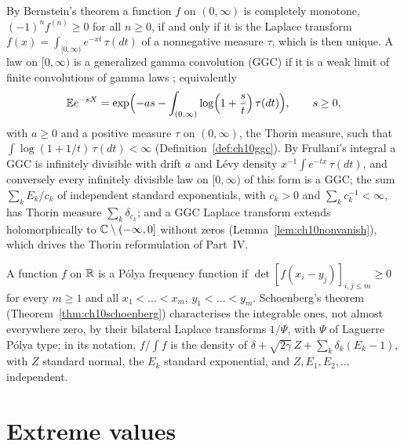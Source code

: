 By Bernstein's theorem \cite{bernstein1929,widder1941} a function $f$ on $(0,\infty)$ is completely monotone, $(-1)^nf^{(n)}\ge0$ for all $n\ge0$, if and only if it is the Laplace transform $f(x)=\int_{[0,\infty)}e^{-xt}\,\tau(dt)$ of a nonnegative measure $\tau$, which is then unique. A law on $[0,\infty)$ is a generalized gamma convolution (GGC) if it is a weak limit of finite convolutions of gamma laws \cite{thorin1977,bondesson1992}; equivalently
\[
\mathbb{E} e^{-sX}=\exp\Bigl(-as-\int_{(0,\infty)}\log\Bigl(1+\frac{s}{t}\Bigr)\,\tau(dt)\Bigr),\qquad s\ge0,
\]
with $a\ge0$ and a positive measure $\tau$ on $(0,\infty)$, the Thorin measure, such that $\int\log(1+1/t)\,\tau(dt)<\infty$ (Definition~\ref{def:ch10ggc}). By Frullani's integral a GGC is infinitely divisible with drift $a$ and L\'evy density $x^{-1}\int e^{-tx}\,\tau(dt)$, and conversely every infinitely divisible law on $[0,\infty)$ of this form is a GGC; the sum $\sum_kE_k/c_k$ of independent standard exponentials, with $c_k>0$ and $\sum_kc_k^{-1}<\infty$, has Thorin measure $\sum_k\delta_{c_k}$; and a GGC Laplace transform extends holomorphically to $\mathbb{C}\setminus(-\infty,0]$ without zeros (Lemma~\ref{lem:ch10nonvanish}), which drives the Thorin reformulation of Part~IV.

A function $f$ on $\mathbb{R}$ is a P\'olya frequency function if $\det[f(x_i-y_j)]_{i,j\le m}\ge0$ for every $m\ge1$ and all $x_1<\dots<x_m$, $y_1<\dots<y_m$. Schoenberg's theorem \cite{schoenberg1951,karlin1968} (Theorem~\ref{thm:ch10schoenberg}) characterises the integrable ones, not almost everywhere zero, by their bilateral Laplace transforms $1/\Psi$, with $\Psi$ of Laguerre P\'olya type; in its notation, $f/\!\int f$ is the density of $\delta+\sqrt{2\gamma}\,Z+\sum_k\delta_k(E_k-1)$, with $Z$ standard normal, the $E_k$ standard exponential, and $Z,E_1,E_2,\dots$ independent.

\section{Extreme values}

